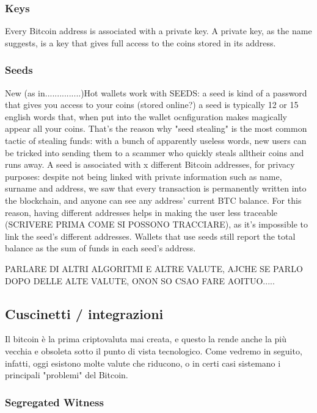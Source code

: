 \documentclass {article}
\begin{document}
\subsubsection {Keys}


Every Bitcoin address is associated with a private key.
A private key, as the name suggests, is a key that gives full access to the coins stored in its address.


\subsubsection {Seeds}


New (as in...............)Hot wallets work with SEEDS: a seed is kind of a password that gives you access to your coins (stored online?) a seed is typically 12 or 15 english words that, when put into the wallet ocnfiguration makes magically appear all your coins.
That's the reason why "seed stealing" is the most common tactic of stealing funds: with a bunch of apparently useless words, new users can be tricked into sending them to a scammer who quickly steals alltheir coins and runs away.
A seed is associated with x different Bitcoin addresses, for privacy purposes: despite not being linked with private information such as name, surname and address, we saw that every transaction is permanently written into the blockchain, and anyone can see any address' current BTC balance.
For this reason, having different addresses helps in making the user less traceable (SCRIVERE PRIMA COME SI POSSONO TRACCIARE), as it's impossible to link the seed's different addresses.
Wallets that use seeds still report the total balance as the sum of funds in each seed's address.


PARLARE DI ALTRI ALGORITMI E ALTRE VALUTE, AJCHE SE PARLO DOPO DELLE ALTE VALUTE, ONON SO CSAO FARE AOITUO.....


\subsection {Cuscinetti / integrazioni}


Il bitcoin è la prima criptovaluta mai creata, e questo la rende anche la più vecchia e obsoleta sotto il punto di vista tecnologico. Come vedremo in seguito, infatti, oggi esistono molte valute che riducono, o in certi casi sistemano i principali "problemi" del Bitcoin.


\subsubsection {Segregated Witness}
\end{document}
